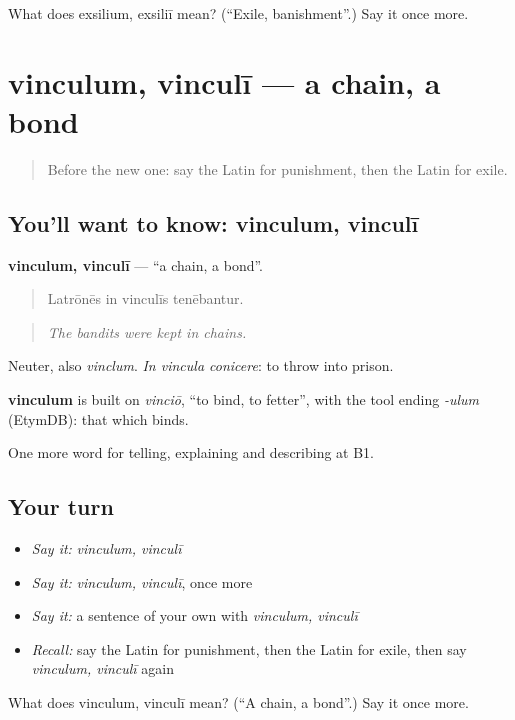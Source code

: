 \begin{tcolorbox}[breakable,colback=teal!4,colframe=teal!35!black,title={Before you move on}]
What does exsilium, exsiliī mean? (\textquotedblleft{}Exile, banishment\textquotedblright{}.) Say it once more.
\end{tcolorbox}
\section[vinculum, vinculī]{vinculum, vinculī — a chain, a bond}

\label{lesson:LA-C312-vinculum}



\begin{quote}
Before the new one: say the Latin for punishment, then the Latin for exile.
\end{quote}

\subsection*{You'll want to know: vinculum, vinculī}
\textbf{vinculum, vinculī} — \textquotedblleft{}a chain, a bond\textquotedblright{}.

\begin{quote}
Latrōnēs in vinculīs tenēbantur.
\end{quote}

\begin{quote}
\emph{The bandits were kept in chains.}
\end{quote}

Neuter, also \emph{vinclum}. \emph{In vincula conicere}: to throw into prison.

\begin{cousinweb}
\textbf{vinculum} is built on \emph{vinciō}, \textquotedblleft{}to bind, to fetter\textquotedblright{}, with the tool ending \emph{-ulum} (EtymDB): that which binds.
\end{cousinweb}

\begin{grammarlens}[title={What you've built}]
One more word for telling, explaining and describing at B1.
\end{grammarlens}

\subsection*{Your turn}
\begin{itemize}
\raggedright
  \item \emph{Say it:} \emph{vinculum, vinculī}
  \item \emph{Say it:} \emph{vinculum, vinculī}, once more
  \item \emph{Say it:} a sentence of your own with \emph{vinculum, vinculī}
  \item \emph{Recall:} say the Latin for punishment, then the Latin for exile, then say \emph{vinculum, vinculī} again
\end{itemize}

\begin{tcolorbox}[breakable,colback=teal!4,colframe=teal!35!black,title={Before you move on}]
What does vinculum, vinculī mean? (\textquotedblleft{}A chain, a bond\textquotedblright{}.) Say it once more.
\end{tcolorbox}

